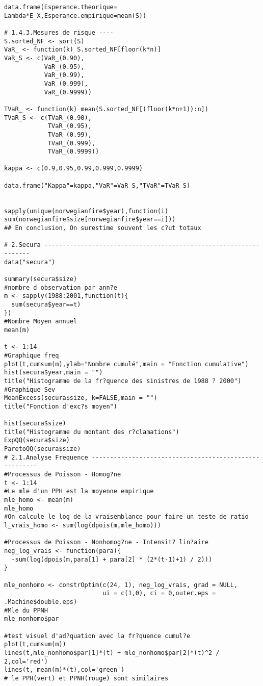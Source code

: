 \begin{verbatim}
data.frame(Esperance.theorique= Lambda*E_X,Esperance.empirique=mean(S))

# 1.4.3.Mesures de risque ----
S.sorted_NF <- sort(S)
VaR_ <- function(k) S.sorted_NF[floor(k*n)]
VaR_S <- c(VaR_(0.90),
           VaR_(0.95),
           VaR_(0.99),
           VaR_(0.999),
           VaR_(0.9999))

TVaR_ <- function(k) mean(S.sorted_NF[(floor(k*n+1)):n])
TVaR_S <- c(TVaR_(0.90),
            TVaR_(0.95),
            TVaR_(0.99),
            TVaR_(0.999),
            TVaR_(0.9999))

kappa <- c(0.9,0.95,0.99,0.999,0.9999)

data.frame("Kappa"=kappa,"VaR"=VaR_S,"TVaR"=TVaR_S)


sapply(unique(norwegianfire$year),function(i) sum(norwegianfire$size[norwegianfire$year==i]))
## En conclusion, On surestime souvent les c?ut totaux

# 2.Secura ------------------------------------------------------------------
data("secura")

summary(secura$size)
#nombre d observation par ann?e
m <- sapply(1988:2001,function(t){
  sum(secura$year==t)  
})
#Nombre Moyen annuel
mean(m)

t <- 1:14
#Graphique freq
plot(t,cumsum(m),ylab="Nombre cumulé",main = "Fonction cumulative")
hist(secura$year,main = "")
title("Histogramme de la fr?quence des sinistres de 1988 ? 2000")
#Graphique Sev
MeanExcess(secura$size, k=FALSE,main = "")
title("Fonction d'exc?s moyen")

hist(secura$size)
title("Histogramme du montant des r?clamations")
ExpQQ(secura$size)
ParetoQQ(secura$size)
# 2.1.Analyse Frequence -------------------------------------------------------
#Processus de Poisson - Homog?ne
t <- 1:14
#Le mle d'un PPH est la moyenne empirique
mle_homo <- mean(m)
mle_homo
#On calcule le log de la vraisemblance pour faire un teste de ratio
l_vrais_homo <- sum(log(dpois(m,mle_homo)))

#Processus de Poisson - Nonhomog?ne - Intensit? lin?aire
neg_log_vrais <- function(para){
  -sum(log(dpois(m,para[1] + para[2] * (2*(t-1)+1) / 2)))
}

mle_nonhomo <- constrOptim(c(24, 1), neg_log_vrais, grad = NULL, 
                           ui = c(1,0), ci = 0,outer.eps = .Machine$double.eps)
#Mle du PPNH
mle_nonhomo$par

#test visuel d'ad?quation avec la fr?quence cumul?e
plot(t,cumsum(m))
lines(t,mle_nonhomo$par[1]*(t) + mle_nonhomo$par[2]*(t)^2 / 2,col='red')
lines(t, mean(m)*(t),col='green')
# le PPH(vert) et PPNH(rouge) sont similaires


\end{verbatim}
